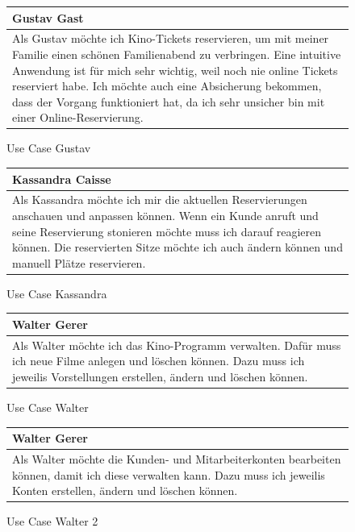 		\begin{figure}[H] \begin{center}
			\begin{tabular}{p{}}
				\textbf{Gustav Gast} \\\toprule
				Als Gustav möchte ich Kino-Tickets reservieren, um mit meiner Familie einen schönen Familienabend zu verbringen. Eine intuitive Anwendung ist für mich sehr wichtig, weil noch nie online Tickets reserviert habe. Ich möchte auch eine Absicherung bekommen, dass der Vorgang funktioniert hat, da ich sehr unsicher bin mit einer Online-Reservierung.
			\end{tabular}
			\caption[Use Case Gustav]{\label{fig:useCaseGustav} Use Case Gustav}
			\end{center}
		\end{figure}
	
		\begin{figure}[H]
			\begin{center}
			\begin{tabular}{p{}}
				\textbf{Kassandra Caisse} \\\toprule
				Als Kassandra möchte ich mir die aktuellen Reservierungen anschauen und anpassen können. Wenn ein Kunde anruft und seine Reservierung stonieren möchte muss ich darauf reagieren können. Die reservierten Sitze möchte ich auch ändern können und manuell Plätze reservieren.
			\end{tabular}
			\caption[Use Case Kassandra]{\label{fig:useCaseKassandra} Use Case Kassandra}
			\end{center}
		\end{figure}

		\begin{figure}[H]
			\begin{center}
			\begin{tabular}{p{}}
				\textbf{Walter Gerer} \\\toprule
				Als Walter möchte ich das Kino-Programm verwalten. Dafür muss ich neue Filme anlegen und löschen können. Dazu muss ich jeweilis Vorstellungen erstellen, ändern und löschen können. 
			\end{tabular}
			\caption[Use Case Walter]{\label{fig:useCaseWalter} Use Case Walter}
			\end{center}
		\end{figure}
	
		\begin{figure}[H]
			\begin{center}
			\begin{tabular}{p{}}
				\textbf{Walter Gerer} \\\toprule
				Als Walter möchte die Kunden- und Mitarbeiterkonten bearbeiten können, damit ich diese verwalten kann. Dazu muss ich jeweilis Konten erstellen, ändern und löschen können. 
			\end{tabular}
			\caption[Use Case Walter 2]{\label{fig:useCaseWalter2} Use Case Walter 2}
			\end{center}
		\end{figure}
		
